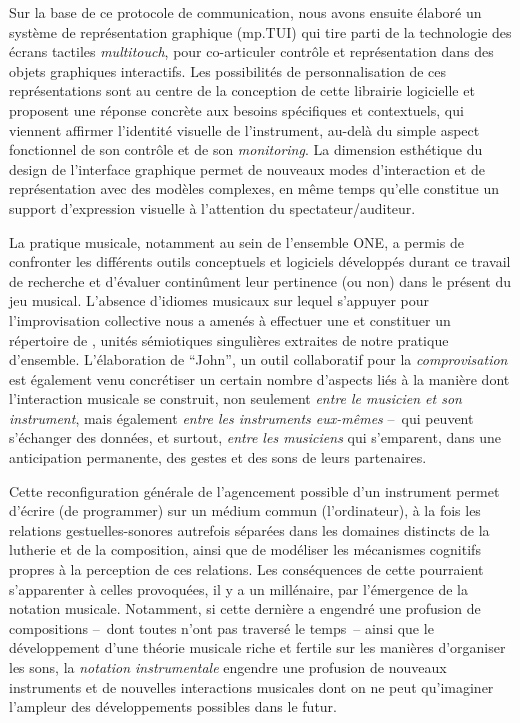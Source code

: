 \noindent Sur la base de ce protocole de communication, nous avons ensuite élaboré un système de représentation graphique (mp.TUI) qui tire parti de la technologie des écrans tactiles \textit{multitouch}, pour co-articuler contrôle et représentation dans des objets graphiques interactifs. Les possibilités de personnalisation de ces représentations sont au centre de la conception de cette librairie logicielle et proposent une réponse concrète aux besoins spécifiques et contextuels, qui viennent affirmer l'identité visuelle de l'instrument, au-delà du simple aspect fonctionnel de son contrôle et de son \textit{monitoring}. La dimension esthétique du design de l'interface graphique permet de nouveaux modes d'interaction et de représentation avec des modèles complexes, en même temps qu'elle constitue un support d'expression visuelle à l'attention du spectateur/auditeur.

\noindent La pratique musicale, notamment au sein de l'ensemble ONE, a permis de confronter les différents outils conceptuels et logiciels développés durant ce travail de recherche et d'évaluer continûment leur pertinence (ou non) dans le présent du jeu musical. L'absence d'idiomes musicaux sur lequel s'appuyer pour l'improvisation collective nous a amenés à effectuer une  et constituer un répertoire de , unités sémiotiques singulières extraites de notre pratique d'ensemble. L'élaboration de ``John'', un outil collaboratif pour la \textit{comprovisation} est également venu concrétiser un certain nombre d'aspects liés à la manière dont l'interaction musicale se construit, non seulement \textit{entre le musicien et son instrument}, mais également \textit{entre les instruments eux-mêmes} --~qui peuvent s'échanger des données, et surtout, \textit{entre les musiciens} qui s'emparent, dans une anticipation permanente, des gestes et des sons de leurs partenaires.


\noindent Cette reconfiguration générale de l'agencement possible d'un instrument permet d'écrire (de programmer) sur un médium commun (l'ordinateur), à la fois les relations gestuelles-sonores autrefois séparées dans les domaines distincts de la lutherie et de la composition, ainsi que de modéliser les mécanismes cognitifs propres à la perception de ces relations. Les conséquences de cette  pourraient s'apparenter à celles provoquées, il y a un millénaire, par l'émergence de la notation musicale. Notamment, si cette dernière a engendré une profusion de compositions --~dont toutes n'ont pas traversé le temps~-- ainsi que le développement d'une théorie musicale riche et fertile sur les manières d'organiser les sons, la \textit{notation instrumentale} engendre une profusion de nouveaux instruments et de nouvelles interactions musicales dont on ne peut qu'imaginer l'ampleur des développements possibles dans le futur.

